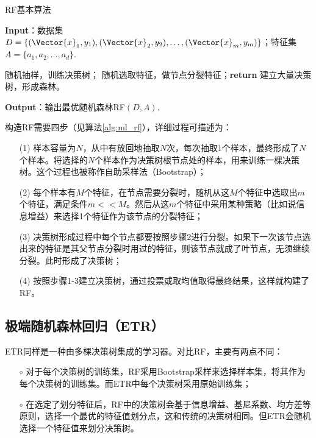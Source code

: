 \begin{algorithm}[!htbp]
  \small
  \caption{RF基本算法}\label{alg:ml_rf}
  \textbf{Input}：{数据集$D=\{(\Vector{x}_1,y_1),(\Vector{x}_2,y_2),\ldots,(\Vector{x}_m,y_m)\}$；特征集$A=\{a_1,a_2,\ldots,a_d\}$.}
  \begin{algorithmic}[1]
    \State 随机抽样，训练决策树；
      \State 随机选取特征，做节点分裂特征；\textbf{return}
    \EndWhile
    \State 建立大量决策树，形成森林。
    \EndProcedure
  \end{algorithmic}
  \textbf{Output}：{输出最优随机森林RF$(D,A)$.}
\end{algorithm}

构造RF需要四步（见算法\ref{alg:ml_rf}），详细过程可描述为：
\begin{enumerate}
  \item[(1)] 样本容量为$N$，从中有放回地抽取$N$次，每次抽取1个样本，最终形成了$N$个样本。将选择的$N$个样本作为决策树根节点处的样本，用来训练一棵决策树。这个过程也被称作自助采样法（Bootstrap）；
  \item[(2)] 每个样本有$M$个特征，在节点需要分裂时，随机从这$M$个特征中选取出$m$个特征，满足条件$m<<M$。然后从这$m$个特征中采用某种策略（比如说信息增益）来选择1个特征作为该节点的分裂特征；
  \item[(3)] 决策树形成过程中每个节点都要按照步骤2进行分裂。如果下一次该节点选出来的特征是其父节点分裂时用过的特征，则该节点就成了叶节点，无须继续分裂。此时形成了决策树；
  \item[(4)] 按照步骤1-3建立决策树，通过投票或取均值取得最终结果，这样就构建了RF。
\end{enumerate}

\subsection{极端随机森林回归（ETR）}\label{sec:ml_etr}

ETR同样是一种由多棵决策树集成的学习器。对比RF，主要有两点不同：
\begin{enumerate}
  \item[$\circ$] 对于每个决策树的训练集，RF采用Bootstrap采样来选择样本集，将其作为每个决策树的训练集。而ETR中每个决策树采用原始训练集；
  \item[$\circ$] 在选定了划分特征后，RF中的决策树会基于信息增益、基尼系数、均方差等原则，选择一个最优的特征值划分点，这和传统的决策树相同。但ETR会随机选择一个特征值来划分决策树。
\end{enumerate}

